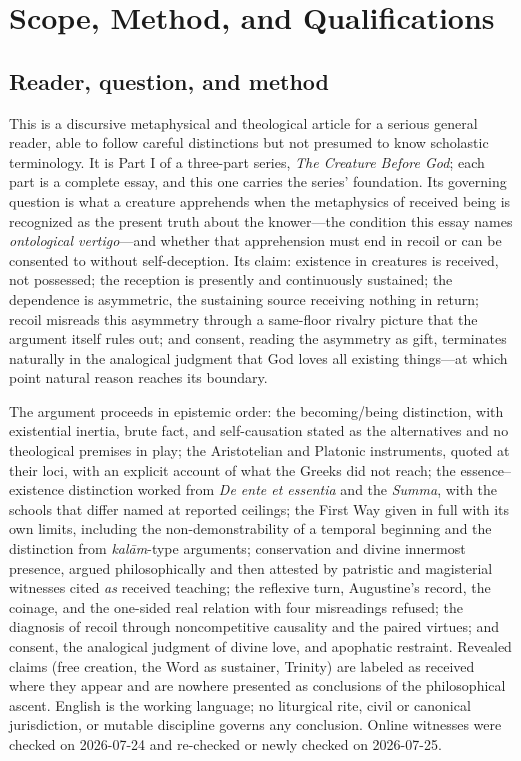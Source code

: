 \section{Scope, Method, and Qualifications}

\subsection{Reader, question, and method}

This is a discursive metaphysical and theological article for a serious general reader, able to follow careful distinctions but not presumed to know scholastic terminology. It is Part I of a three-part series, \emph{The Creature Before God}; each part is a complete essay, and this one carries the series' foundation. Its governing question is what a creature apprehends when the metaphysics of received being is recognized as the present truth about the knower---the condition this essay names \emph{ontological vertigo}---and whether that apprehension must end in recoil or can be consented to without self-deception. Its claim: existence in creatures is received, not possessed; the reception is presently and continuously sustained; the dependence is asymmetric, the sustaining source receiving nothing in return; recoil misreads this asymmetry through a same-floor rivalry picture that the argument itself rules out; and consent, reading the asymmetry as gift, terminates naturally in the analogical judgment that God loves all existing things---at which point natural reason reaches its boundary.

The argument proceeds in epistemic order: the becoming/being distinction, with existential inertia, brute fact, and self-causation stated as the alternatives and no theological premises in play; the Aristotelian and Platonic instruments, quoted at their loci, with an explicit account of what the Greeks did not reach; the essence--existence distinction worked from \emph{De ente et essentia} and the \emph{Summa}, with the schools that differ named at reported ceilings; the First Way given in full with its own limits, including the non-demonstrability of a temporal beginning and the distinction from \emph{kal\=am}-type arguments; conservation and divine innermost presence, argued philosophically and then attested by patristic and magisterial witnesses cited \emph{as} received teaching; the reflexive turn, Augustine's record, the coinage, and the one-sided real relation with four misreadings refused; the diagnosis of recoil through noncompetitive causality and the paired virtues; and consent, the analogical judgment of divine love, and apophatic restraint. Revealed claims (free creation, the Word as sustainer, Trinity) are labeled as received where they appear and are nowhere presented as conclusions of the philosophical ascent. English is the working language; no liturgical rite, civil or canonical jurisdiction, or mutable discipline governs any conclusion. Online witnesses were checked on 2026-07-24 and re-checked or newly checked on 2026-07-25.

